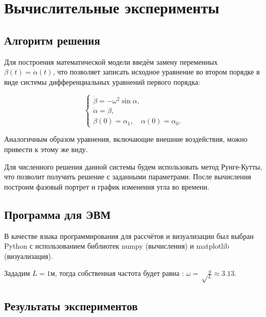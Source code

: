 \chapter{Вычислительные эксперименты}
\section{Алгоритм решения}
Для построения математической модели введём замену переменных $\beta(t) = \dot{\alpha}(t)$, что позволяет записать исходное уравнение во втором порядке в виде системы дифференциальных уравнений первого порядка:

\[
\begin{cases}
	\dot{\beta} = -\omega^2 \sin \alpha, \\
	\dot{\alpha} = \beta, \\
	\beta(0) = \alpha_1, \quad \alpha(0) = \alpha_0.
\end{cases}
\]

Аналогичным образом уравнения, включающие внешние воздействия, можно привести к этому же виду.

Для численного решения данной системы будем использовать метод Рунге-Кутты, что позволит получить решение с заданными параметрами. После вычисления построим фазовый портрет и график изменения угла во времени.

\section{Программа для ЭВМ}
В качестве языка программирования для рассчётов и визуализации был выбран Python с использованием библиотек numpy (вычисления) и matplotlib (визуализация).

 

Зададим $L = 1\text{м}$, тогда собственная частота будет равна : $\omega = \sqrt\frac{g}{L} \approx 3.13$.
\section{Результаты  экспериментов}
